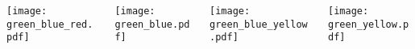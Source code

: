 \documentclass{beamer}
\begin{document}
\begin{frame}
    \begin{columns}[onlytextwidth]
        \begin{column}{0.25\textwidth}
            \texttt{[image: green\_blue\_red.pdf]}
        \end{column}
        \pause
        \begin{column}{0.25\textwidth}
\begin{minipage}{\textwidth}
            \vspace{3cm}
            \texttt{[image: green\_blue.pdf]}
\end{minipage}
        \end{column}
        \pause
        \begin{column}{0.25\textwidth}
\begin{minipage}{\textwidth}
            \vspace{3cm}
            \texttt{[image: green\_blue\_yellow.pdf]}
\end{minipage}
        \end{column}
        \pause
        \begin{column}{0.25\textwidth}

            \texttt{[image: green\_yellow.pdf]}
        \end{column}
    \end{columns}
\end{frame}
\end{document}
